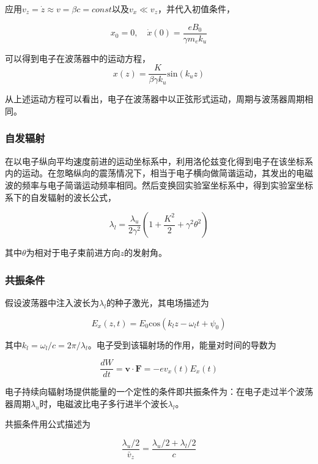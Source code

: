 应用$v_{z}=\dot{z} \approx v = \beta c = const$以及$v_{x} \ll v_{z}$，并代入初值条件，

$$x_{0} = 0, \quad \dot{x}(0) = \frac{eB_{0}}{\gamma m_{e} k_{u}}$$

可以得到电子在波荡器中的运动方程，
\begin{equation}
x(z) = \frac{K}{\beta \gamma k_{u}} \text{sin} (k_{u}z)
\end{equation}

从上述运动方程可以看出，电子在波荡器中以正弦形式运动，周期与波荡器周期相同。

\subsubsection{自发辐射}

在以电子纵向平均速度前进的运动坐标系中，利用洛伦兹变化得到电子在该坐标系内的运动。在忽略纵向的震荡情况下，相当于电子横向做简谐运动，其发出的电磁波的频率与电子简谐运动频率相同。然后变换回实验室坐标系中，得到实验室坐标系下的自发辐射的波长公式，

\begin{equation}
\lambda_{l} = \frac{\lambda_{u}}{2 \gamma ^{2}} (1 + \frac{K^{2}}{2} + \gamma^{2} \theta ^{2})
\end{equation}

其中$\theta$为相对于电子束前进方向$z$的发射角。

\subsubsection{共振条件}

假设波荡器中注入波长为$\lambda_{l}$的种子激光，其电场描述为

\begin{equation}
E_{x}(z,t) = E_{0}\text{cos}(k_{l}z - \omega_{l} t + \psi _{0})
\end{equation}

其中$k_{l} = \omega _{l} / c = 2\pi / \lambda_{l}$。电子受到该辐射场的作用，能量对时间的导数为

\begin{equation}
\frac{dW}{dt} = \bm{v \cdot F} = -e v_{x}(t)E_{x}(t)
\end{equation}

电子持续向辐射场提供能量的一个定性的条件即共振条件为：在电子走过半个波荡器周期$\lambda_{u}$时，电磁波比电子多行进半个波长$\lambda_{l}$。

共振条件用公式描述为

\begin{equation}
\frac{\lambda_{u} / 2}{\bar{v}_{z}} = \frac{\lambda_{u} / 2 + \lambda_{l} /2}{c}
\end{equation}

